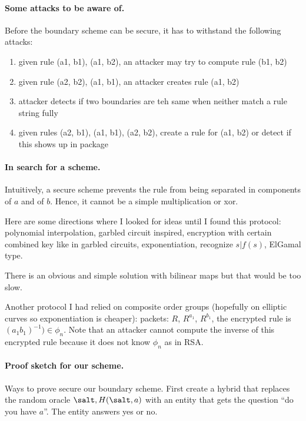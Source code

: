 
\paragraph{Some attacks to be aware of.}
Before the boundary scheme can be secure, it has to withstand the following attacks:

\begin{enumerate}
\item given rule (a1, b1), (a1, b2), an attacker may try to compute rule (b1, b2)
\item given rule (a2, b2), (a1, b1), an attacker creates rule (a1, b2)
\item attacker detects if two boundaries are teh same when neither match a rule string fully
\item \label{step:rule} given rules (a2, b1), (a1, b1), (a2, b2), create a rule for (a1, b2) or detect if this shows up in package
\end{enumerate}

\paragraph{In search for a scheme.}
Intuitively, a secure scheme prevents the rule from being separated in components of $a$ and of $b$. Hence, it cannot be a simple multiplication or xor. 

Here are some directions where I looked for ideas until I found this protocol: polynomial interpolation, garbled circuit inspired, encryption with certain combined key like in garbled circuits, exponentiation, recognize $s | f(s)$, ElGamal type. 

There is an obvious and simple solution with bilinear maps but that would be too slow.  

Another protocol I had relied on composite order groups (hopefully on elliptic curves so exponentiation is cheaper): packets: $R$, $R^{a_1}$, $R^{b_1}$, the encrypted rule is $(a_1b_1)^{-1}) \in \phi_n$. Note that an attacker cannot compute the inverse of this encrypted rule because it does not know $\phi_n$ as in RSA. 


\paragraph{Proof sketch for our scheme.}
Ways to prove secure our boundary scheme. First create a hybrid that replaces the random oracle $\salt, H(\salt, a)$ with an entity that gets the question ``do you have $a$''. The entity answers yes or no. 

